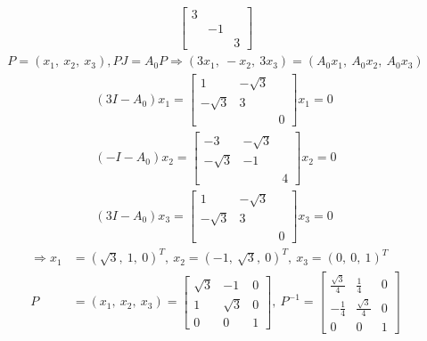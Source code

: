 \begin{solution}
\begin{enumerate}
\begin{enumerate}
\begin{align*}
\begin{bmatrix}
                                    3 & & \\ & -1 & \\ & & 3
                                \end{bmatrix}
                            \end{align*}                      
                            \begin{align*}
                                P = (x_1, \ x_2, \ x_3), PJ= A_0P \Rightarrow (3x_1, \ -x_2, \ 3x_3) = (A_0x_1, \ A_0x_2, \ A_0x_3) 
                            \end{align*}
                            \begin{align*}
                                (3I - A_0)x_1 = \begin{bmatrix}
                                    1 & -\sqrt{3} & \\ -\sqrt{3} & 3 & \\ & & 0 
                                \end{bmatrix}x_1 = 0 \\ (-I - A_0)x_2 = \begin{bmatrix}
                                    -3 & -\sqrt{3} & \\ -\sqrt{3} & -1 & \\ & & 4
                                \end{bmatrix}x_2 = 0 \\ (3I - A_0)x_3 = \begin{bmatrix}
                                    1 & -\sqrt{3} & \\ -\sqrt{3} & 3 & \\ & & 0 
                                \end{bmatrix}x_3 = 0
                        \end{align*}
                            \begin{align*}
                                \Rightarrow x_1 &= (\sqrt{3}, \ 1, \ 0)^T, \ x_2 = (-1, \ \sqrt{3}, \ 0)^T, \ x_3 = (0, \ 0, \ 1)^T \\
                                P &= (x_1, \ x_2, \ x_3) = \begin{bmatrix}
                                    \sqrt{3} & -1 & 0 \\ 1 & \sqrt{3} & 0 \\ 0 & 0 & 1
                                \end{bmatrix}, \ P^{-1} = \begin{bmatrix}
                                    \frac{\sqrt{3}}{4} & \frac{1}{4} & 0 \\ -\frac{1}{4} & \frac{\sqrt{3}}{4} & 0 \\ 0 & 0 & 1

\end{bmatrix}
\end{align*}
\end{enumerate}
\end{enumerate}
\end{solution}
